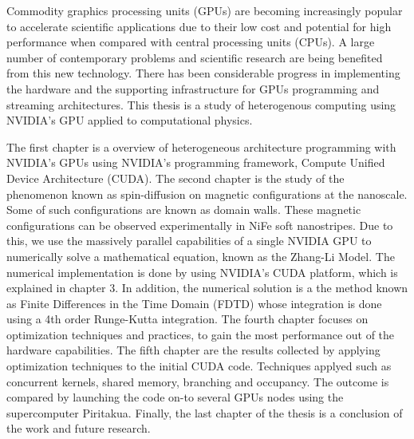 \documentclass[11pt, oneside, a4paper]{Thesis} %
\begin{document}
\introductions

\bigskip

Commodity graphics processing units (GPUs) are becoming increasingly popular to accelerate scientific applications due to their low cost and potential for high performance when compared with central processing units (CPUs). A large number of contemporary problems and scientific research are being benefited from this new technology. There has been considerable progress in implementing the hardware and the supporting infrastructure for GPUs programming and streaming architectures. This thesis is a study of heterogenous computing using NVIDIA's GPU applied to computational physics.

The first chapter is a overview of heterogeneous architecture programming with NVIDIA's GPUs using NVIDIA's programming framework, Compute Unified Device Architecture (CUDA). The second chapter is the study of the phenomenon known as spin-diffusion on magnetic configurations at the nanoscale. Some of such configurations are known as domain walls. These magnetic configurations can be observed experimentally in NiFe soft nanostripes. Due to this, we use the massively parallel capabilities of a single NVIDIA GPU to numerically solve a mathematical equation, known as the Zhang-Li Model. The numerical implementation is done by using NVIDIA's CUDA platform, which is explained in chapter 3. In addition, the numerical solution is a the method known as Finite Differences in the Time Domain (FDTD) whose integration is done using a 4th order Runge-Kutta integration. The fourth chapter focuses on optimization techniques and practices, to gain the most performance out of the hardware capabilities. The fifth chapter are the results collected by applying optimization techniques to the initial CUDA code. Techniques applyed such as concurrent kernels, shared memory, branching and occupancy. The outcome is compared by launching the code on-to several GPUs nodes using the supercomputer Piritakua. Finally, the last chapter of the thesis is a conclusion of the work and future research.


\clearpage




\mainmatter %
\end{document}

